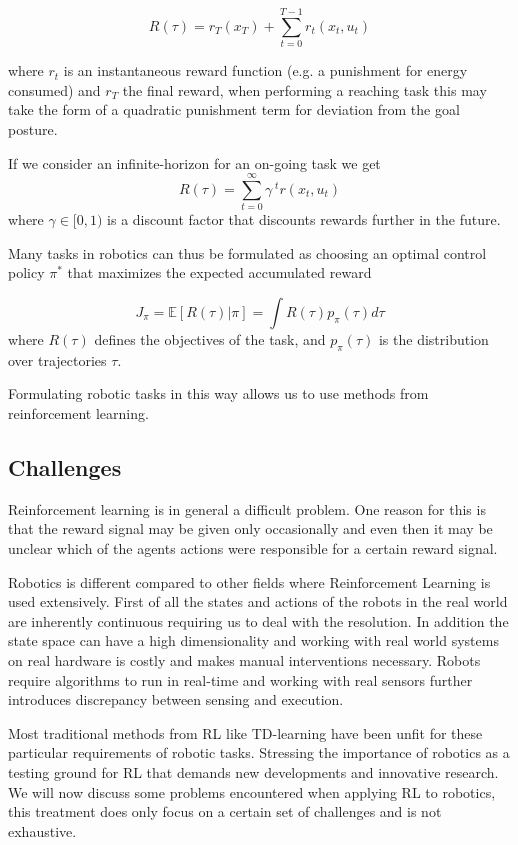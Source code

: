 $$ R(\tau) = r_T(x_T) + \sum^{T-1}_{t=0} r_t(x_t,u_t) $$

where $r_t$ is an instantaneous reward function (e.g. a punishment for energy consumed)
and $r_T$ the final reward, when performing a reaching task this may take the
form of a quadratic punishment term for deviation from the goal posture.

If we consider an infinite-horizon for an on-going task we get
$$ R(\tau) = \sum^{\infty}_{t=0} \gamma^{\; t} r(x_t, u_t) $$
where $\gamma \in [0,1)$ is a discount factor that discounts rewards further in the future.

Many tasks in robotics can thus be formulated as choosing an optimal control
policy $\pi^*$ that maximizes the expected accumulated reward

$$ J_{\pi} = \mathbb{E}[R(\tau) | \pi] = \int R(\tau) p_{\pi}(\tau) d\tau $$
where $R(\tau)$ defines the objectives of the task, and $p_{\pi}(\tau)$ is the
distribution over trajectories $\tau$.

Formulating robotic tasks in this way allows us to use methods from
reinforcement learning. 

\subsection{Challenges}
Reinforcement learning is in general a difficult problem. One reason
for this is that the reward signal may be given only occasionally and
even then it may be unclear which of
the agents actions were responsible for a certain
reward signal. 

Robotics is different compared to other fields where Reinforcement Learning
is used extensively. First of all the states and actions of the robots in the
real world are inherently continuous requiring us to
deal with the resolution.
In addition the state space can have a high dimensionality and
working with real world systems on real hardware is costly and
makes manual interventions necessary.
Robots require algorithms to run in real-time and working with
real sensors further introduces discrepancy between sensing and
execution.

Most traditional methods from RL like
TD-learning \citep{sutton2018reinforcement}
have been unfit for these particular requirements of robotic tasks.
Stressing the importance of robotics as a testing ground for RL that
demands new developments and innovative research.
We will now discuss some problems encountered when applying
RL to robotics, this treatment does only focus on a certain
set of challenges and is not exhaustive.

